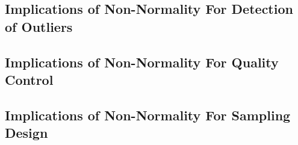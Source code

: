 \documentclass[]{book}
\begin{document}
\hypertarget{implications-of-non-normality-for-detection-of-outliers}{%
\subsection{Implications of Non-Normality For Detection of Outliers}\label{implications-of-non-normality-for-detection-of-outliers}}

\hypertarget{implications-of-non-normality-for-quality-control}{%
\subsection{Implications of Non-Normality For Quality Control}\label{implications-of-non-normality-for-quality-control}}

\hypertarget{implications-of-non-normality-for-sampling-design}{%
\subsection{Implications of Non-Normality For Sampling Design}\label{implications-of-non-normality-for-sampling-design}}


\end{document}
